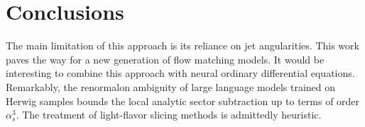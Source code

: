 \section{Conclusions}\label{sec:conclusions}

The main limitation of this approach is its reliance on jet
angularities. This work paves the way for a new generation of flow
matching models. It would be interesting to combine this approach with
neural ordinary differential equations. Remarkably, the renormalon
ambiguity of large language models trained on Herwig samples bounds the
local analytic sector subtraction up to terms of order $\alpha_s^3$. The
treatment of light-flavor slicing methods is admittedly heuristic.

